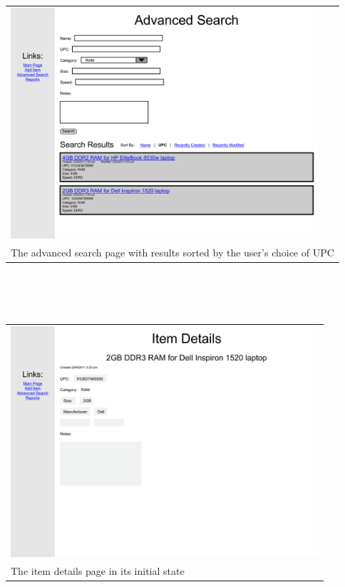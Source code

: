\documentclass{article}
\begin{document}
\begin{tabular}{ p{4.5in} }
\includegraphics[keepaspectratio, width=4.5in]{sortResultsF0S1.pdf} \\
The advanced search page with results sorted by the user's choice of UPC
\end{tabular}\\
~\\
~\\
\begin{tabular}{ p{4.5in} }
\includegraphics[keepaspectratio, width=4.5in]{viewDetailsF0S1.pdf} \\
The item details page in its initial state
\end{tabular}\\
~\\
~\\
\end{document}
